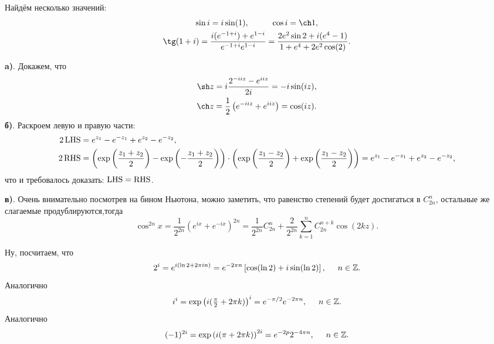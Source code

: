 
Найдём несколько значений:
\begin{gather*}
    \sin i = i \sin (1), 
    \hspace{10 mm} 
    \cos i = \ch 1,
    \\
    \tg(1 + i) =  
    \frac{i (e^{-1 + i}) + e^{1-i}}{e^{-1 + i} e^{1-i}}
    = \frac{2 e^2 \sin 2 + i(e^4-1)}{1 + e^4 + 2 e^2 \cos(2)}.
\end{gather*}



\textbf{a)}. Докажем, что
\begin{align*}
    \sh z = i \frac{2^{- i i z} - e^{i i z}}{2 i} = - i \sin(i z), \\
    \ch z = \frac{1}{2}\left(e^{- iiz} + e^{iiz}\right) = \cos(iz).
\end{align*}
\textbf{б)}. Раскроем левую и правую части:
\begin{align*}
    2 \mathop{\mathrm{LHS}}\nolimits &= e^{z_1} - e^{- z_1} + e^{z_2} - e^{-z_2}, \\
    2 \mathop{\mathrm{RHS}}\nolimits &= \left(
        \exp\left(\frac{z_1 + z_2}{2}\right) - \exp\left(- \frac{z_1 + z_2}{2}\right) \right)
        \cdot \left(
            \exp\left(\frac{z_1 - z_2}{2}\right)  + \exp\left(
                \frac{z_1 - z_2}{2}
            \right)
    \right) = e^{z_1} - e^{- z_1} + e^{z_2} - e^{-z_2},
\end{align*}
что и требовалось доказать: $\mathop{\mathrm{LHS}}\nolimits = \mathop{\mathrm{RHS}}\nolimits$.

\textbf{в)}. Очень внимательно посмотрев на бином Ньютона, можно заметить, что равенство степений будет достигаться в $C^n_{2n}$, остальные же слагаемые продублируются,тогда
\begin{equation*}
    \cos^{2n} x = 
    \frac{1}{2^{2n}}\left(e^{ix} + e^{-ix}\right)^{2n} = 
    \frac{1}{2^{2n}} C_{2n}^n + \frac{2}{2^{2n}} \sum_{k=1}^{n} C_{2n}^{n+k} \cos (2 k z).
\end{equation*}




Ну, посчитаем, что
\begin{equation*}
    2^i = e^{i (\ln 2 + 2 \pi i n)} =  e^{- 2\pi n}\left[\cos (\ln 2) + i \sin (\ln 2)\right]
    , \hspace{5 mm} 
    n \in \mathbb{Z}.
\end{equation*}
Аналогично
\begin{equation*}
    i^i = \exp\left(i (\tfrac{\pi}{2} + 2 \pi k)\right)^i = e^{- \pi /2} e^{- 2 \pi n},
    \hspace{5 mm} 
    n \in \mathbb{Z}.
\end{equation*}
Аналогично
\begin{equation*}
    (-1)^{2 i} = \exp\left(i (\pi  + 2 \pi k)\right)^{2i} = e^{-2 p} 2^{- 4 \pi n},
    \hspace{5 mm} 
    n \in \mathbb{Z}.
\end{equation*}


